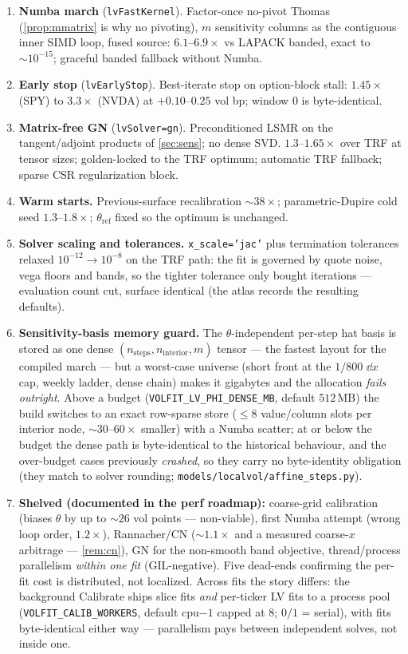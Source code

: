 \documentclass[11pt]{article}
\begin{document}
\begin{enumerate}[leftmargin=1.6em]
\item \textbf{Numba march} (\texttt{lvFastKernel}). Factor-once no-pivot Thomas
(\cref{prop:mmatrix} is why no pivoting), $m$ sensitivity columns as the
contiguous inner SIMD loop, fused source: $6.1$--$6.9\times$ vs LAPACK banded,
exact to $\sim10^{-15}$; graceful banded fallback without Numba.
\item \textbf{Early stop} (\texttt{lvEarlyStop}). Best-iterate stop on
option-block stall: $1.45\times$ (SPY) to $3.3\times$ (NVDA) at
$+0.10$--$0.25$ vol bp; window $0$ is byte-identical.
\item \textbf{Matrix-free GN} (\texttt{lvSolver=gn}). Preconditioned LSMR on
the tangent/adjoint products of \cref{sec:sens}; no dense SVD.
$1.3$--$1.65\times$ over TRF at tensor sizes; golden-locked to the TRF
optimum; automatic TRF fallback; sparse CSR regularization block.
\item \textbf{Warm starts.} Previous-surface recalibration $\sim38\times$;
parametric-Dupire cold seed $1.3$--$1.8\times$; $\theta_{\text{ref}}$ fixed so
the optimum is unchanged.
\item \textbf{Solver scaling and tolerances.} \samepage
\texttt{x\_scale='jac'} plus termination tolerances relaxed
$10^{-12}\to10^{-8}$ on the TRF path: the fit is governed by quote noise,
vega floors and bands, so the tighter tolerance only bought iterations ---
evaluation count cut, surface identical (the atlas records the resulting
defaults).
\item \textbf{Sensitivity-basis memory guard.} The $\theta$-independent
per-step hat basis is stored as one dense
$(n_{\text{steps}},n_{\text{interior}},m)$ tensor --- the fastest layout for
the compiled march --- but a worst-case universe (short front at the $1/800$
$\dd x$ cap, weekly ladder, dense chain) makes it gigabytes and the
allocation \emph{fails outright}. Above a budget
(\texttt{VOLFIT\_LV\_PHI\_DENSE\_MB}, default $512$\,MB) the build switches
to an exact row-sparse store ($\le8$ value/column slots per interior node,
$\sim30$--$60\times$ smaller) with a Numba scatter; at or below the budget
the dense path is byte-identical to the historical behaviour, and the
over-budget cases previously \emph{crashed}, so they carry no byte-identity
obligation (they match to solver rounding;
\nolinkurl{models/localvol/affine_steps.py}).
\item \textbf{Shelved (documented in the perf roadmap):} coarse-grid calibration
(biases $\theta$ by up to $\sim26$ vol points --- non-viable), first Numba
attempt (wrong loop order, $1.2\times$), Rannacher/CN ($\sim1.1\times$ and a
measured coarse-$x$ arbitrage --- \cref{rem:cn}), GN for the non-smooth band
objective, thread/process parallelism \emph{within one fit} (GIL-negative).
Five dead-ends confirming the per-fit cost is distributed, not localized.
Across fits the story differs: the background Calibrate ships slice fits
\emph{and} per-ticker LV fits to a process pool
(\texttt{VOLFIT\_CALIB\_WORKERS}, default cpu$-1$ capped at $8$; $0/1$ =
serial), with fits byte-identical either way --- parallelism pays between
independent solves, not inside one.
\end{enumerate}
\end{document}
